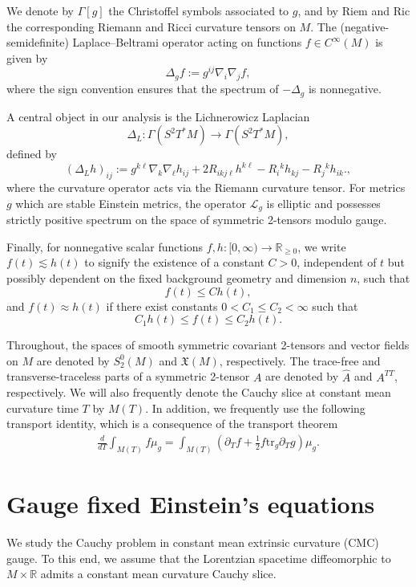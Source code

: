 \documentclass{amsart}
\newcommand{\tr}{\mbox{tr}}
\begin{document}
\noindent We denote by $\Gamma[g]$ the Christoffel symbols associated to $g$, and by $\mathrm{Riem}$ and $\mathrm{Ric}$ the corresponding Riemann and Ricci curvature tensors on $M$. The (negative-semidefinite) Laplace--Beltrami operator acting on functions $f \in C^\infty(M)$ is given by
\[
\Delta_g f := g^{ij} \nabla_i \nabla_j f,
\]
where the sign convention ensures that the spectrum of $-\Delta_g$ is nonnegative.

\noindent A central object in our analysis is the Lichnerowicz Laplacian
\[
\Delta_{L} : \Gamma(S^2 T^* M) \to \Gamma(S^2 T^* M),
\]
defined by
\[
(\Delta_{L} h)_{ij}
:=
g^{k\ell}\nabla_k\nabla_\ell h_{ij}
+2R_{ikj\ell}h^{k\ell}
-R_i{}^{k}h_{kj}
-R_j{}^{k}h_{ik}.,
\]
where the curvature operator acts via the Riemann curvature tensor. For metrics $g$ which are stable Einstein metrics, the operator $\mathcal{L}_g$ is elliptic and possesses strictly positive spectrum on the space of symmetric 2-tensors modulo gauge.

\noindent Finally, for nonnegative scalar functions $f,h : [0,\infty) \to \mathbb{R}_{\geq 0}$, we write $f(t) \lesssim h(t)$ to signify the existence of a constant $C > 0$, independent of $t$ but possibly dependent on the fixed background geometry and dimension $n$, such that
\[
f(t) \leq C h(t),
\]
and $f(t) \approx h(t)$ if there exist constants $0 < C_1 \leq C_2 < \infty$ such that
\[
C_1 h(t) \leq f(t) \leq C_2 h(t).
\]

\noindent Throughout, the spaces of smooth symmetric covariant 2-tensors and vector fields on $M$ are denoted by $S^0_2(M)$ and $\mathfrak{X}(M)$, respectively. The trace-free and transverse-traceless parts of a symmetric 2-tensor $A$ are denoted by $\widehat{A}$ and $A^{TT}$, respectively. We will also frequently denote the Cauchy slice at constant mean curvature time $T$ by $M(T)$. In addition, we frequently use the following transport identity, which is a consequence of the transport theorem \cite{marsden}
\begin{align}
 \frac{d}{dT}\int_{M(T)}f\mu_{g}=\int_{M(T)}(\partial_{T}f+\frac{1}{2}f\tr_{g}\partial_{T}g)\mu_{g}.   
\end{align}


\section{Gauge fixed Einstein's equations}
\label{mainsection}
\noindent We study the Cauchy problem in constant mean extrinsic curvature (CMC) gauge. To this end, we assume that the Lorentzian spacetime diffeomorphic to $M\times \mathbb{R}$ admits a constant mean curvature Cauchy slice. 
\end{document}
